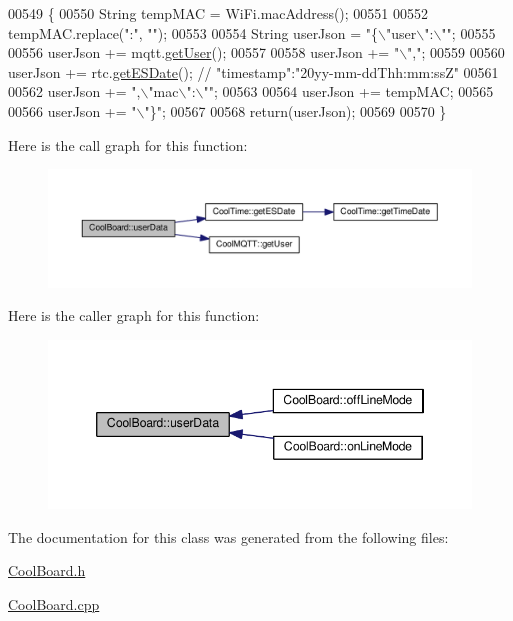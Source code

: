 \begin{DoxyCode}
00549 \{
00550     String tempMAC = WiFi.macAddress();
00551 
00552     tempMAC.replace(\textcolor{stringliteral}{":"}, \textcolor{stringliteral}{""});
00553 
00554     String userJson = \textcolor{stringliteral}{"\{\(\backslash\)"user\(\backslash\)":\(\backslash\)""};
00555 
00556     userJson += mqtt.\hyperlink{class_cool_m_q_t_t_a373cc92fca7760d886f02d8a6e5b3f63}{getUser}();
00557 
00558     userJson += \textcolor{stringliteral}{"\(\backslash\)","};
00559 
00560     userJson += rtc.\hyperlink{class_cool_time_ac4f32ee513c1328d984306645e8785a4}{getESDate}(); \textcolor{comment}{// "timestamp":"20yy-mm-ddThh:mm:ssZ"}
00561 
00562     userJson += \textcolor{stringliteral}{",\(\backslash\)"mac\(\backslash\)":\(\backslash\)""};
00563 
00564     userJson += tempMAC;
00565 
00566     userJson += \textcolor{stringliteral}{"\(\backslash\)"\}"};  
00567     
00568     \textcolor{keywordflow}{return}(userJson);
00569     
00570 \}
\end{DoxyCode}
Here is the call graph for this function\+:
\nopagebreak
\begin{figure}[H]
\begin{center}
\leavevmode
\includegraphics[width=350pt]{class_cool_board_ae7358fb6e623cfc81b775f5f1734909b_cgraph}
\end{center}
\end{figure}
Here is the caller graph for this function\+:
\nopagebreak
\begin{figure}[H]
\begin{center}
\leavevmode
\includegraphics[width=346pt]{class_cool_board_ae7358fb6e623cfc81b775f5f1734909b_icgraph}
\end{center}
\end{figure}


The documentation for this class was generated from the following files\+:\begin{DoxyCompactItemize}
\item 
\hyperlink{_cool_board_8h}{Cool\+Board.\+h}\item 
\hyperlink{_cool_board_8cpp}{Cool\+Board.\+cpp}\end{DoxyCompactItemize}
